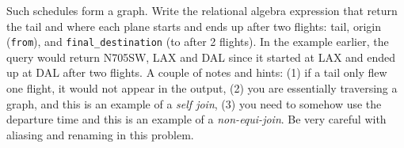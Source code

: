 \documentclass{report}
\renewcommand{\tt}[1]{\texttt{{#1}}}
\begin{document}
\begin{enumerate}[label=(\alph*)]
        Such schedules form a graph. Write the relational algebra expression that return the tail 
        and where each plane starts and ends up after two flights: tail, origin (\tt{from}), and 
        \tt{final\_destination} (to after 2 flights). In the example earlier, the query would 
        return N705SW, LAX and DAL since it started at LAX and ended up at DAL after two flights. 
        A couple of notes and hints: (1) if a tail only flew one flight, it would not appear in the 
        output, (2) you are essentially traversing a graph, and this is an example of a 
        \emph{self join}, (3) you need to somehow use the departure time and this is an example of 
        a \emph{non-equi-join}. Be very careful with aliasing and renaming in this problem.
\end{enumerate}
\end{document}
